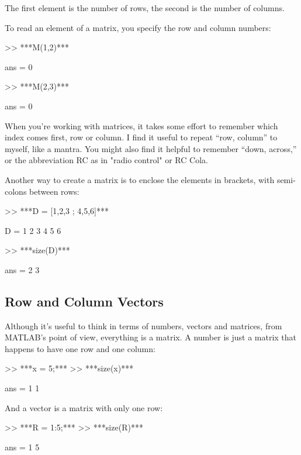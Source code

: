 The first element is the number of rows, the second is the number of
columns.


To read an element of a matrix, you specify the row and column numbers:

\begin{code}
>> ***M(1,2)***

ans = 0

>> ***M(2,3)***

ans = 0
\end{code}

When you're working with matrices, it takes some effort to remember
which index comes first, row or column.  I find it useful to repeat
``row, column'' to myself, like a mantra.  You might also find it
helpful to remember ``down, across,'' or the abbreviation RC as in "radio control" or RC Cola.

Another way to create a matrix is to enclose the elements in
brackets, with semi-colons between rows:

\begin{code}
>> ***D = [1,2,3 ; 4,5,6]***

D =  1     2     3
     4     5     6

>> ***size(D)***

ans = 2     3
\end{code}


\subsection{Row and Column Vectors}
\label{rowvector}


Although it's useful to think in terms of numbers, vectors and matrices,
from MATLAB's point of view, everything is a matrix.  A number
is just a matrix that happens to have one row and one column:

\begin{code}
>> ***x = 5;***
>> ***size(x)***

ans = 1     1
\end{code}

And a vector is a matrix with only one row:

\begin{code}
>> ***R = 1:5;***
>> ***size(R)***

ans = 1     5
\end{code}

